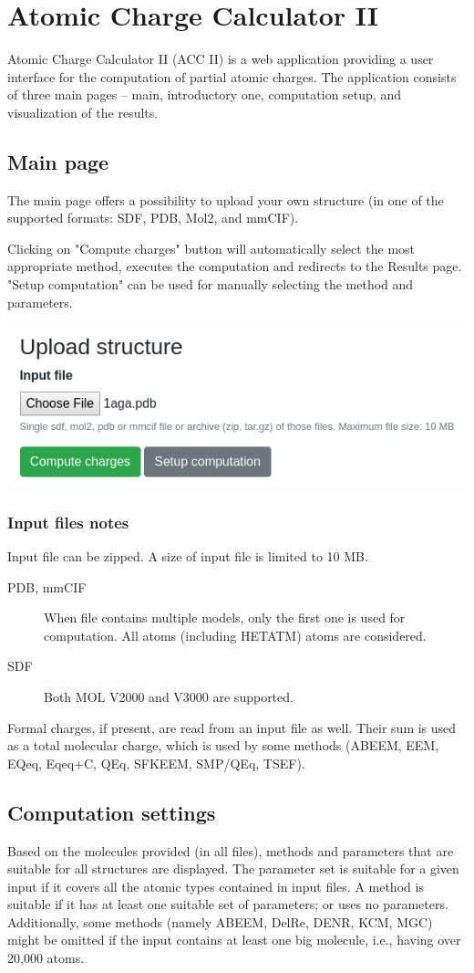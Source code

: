 \documentclass[oneside]{memoir}
\begin{document}
\chapter*{Atomic Charge Calculator \textcolor{ACCgreen}{II}}
Atomic Charge Calculator II (ACC II) is a web application providing a user interface for the computation of partial atomic charges. The application consists of three main pages – main, introductory one, computation setup, and visualization of the results.

\section*{Main page}
The main page offers a possibility to upload your own structure (in one of the supported formats: SDF, PDB, Mol2, and mmCIF).

Clicking on "Compute charges" button will automatically select the most appropriate method, executes the computation and redirects to the Results page. "Setup computation" can be used for manually selecting the method and parameters.

\begin{center}
    \includegraphics[width=.5\linewidth]{images/upload.png}
\end{center}

\subsection*{Input files notes}
Input file can be zipped. A size of input file is limited to 10 MB.
\begin{description}
\item[PDB, mmCIF] When file contains multiple models, only the first one is used for computation. All atoms (including HETATM) atoms are considered.
\item[SDF] Both MOL V2000 and V3000 are supported.
\end{description}

Formal charges, if present, are read from an input file as well. Their sum is used as a total molecular charge, which is used by some methods (ABEEM, EEM, EQeq, Eqeq+C, QEq, SFKEEM, SMP/QEq, TSEF).

\section*{Computation settings}
Based on the molecules provided (in all files), methods and parameters that are suitable for all structures are displayed. The parameter set is suitable for a given input if it covers all the atomic types contained in input files. A method is suitable if it has at least one suitable set of parameters; or uses no parameters. Additionally, some methods (namely ABEEM, DelRe, DENR, KCM, MGC) might be omitted if the input contains at least one big molecule, i.e., having over 20,000 atoms.
\end{document}
